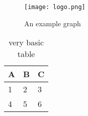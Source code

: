 \begin{figure}[h]
\centering
\texttt{[image: logo.png]}
\caption{An example graph}
\label{fig:x test1}
\end{figure}

\begin{table}[h]
\centering
\begin{tabular}{l | l | l}
A & B & C \\
\hline
1 & 2 & 3 \\
4 & 5 & 6
\end{tabular}
\caption{very basic table}
\label{tab:abc}
\end{table}



